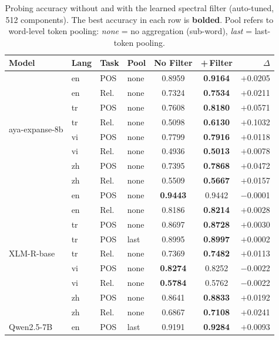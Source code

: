\begin{table}[h]
\centering
\small
\caption{Probing accuracy without and with the learned spectral filter (auto-tuned, 512 components).
         The best accuracy in each row is \textbf{bolded}.
         Pool refers to word-level token pooling: \textit{none} = no aggregation (sub-word),
         \textit{last} = last-token pooling.}
\label{tab:filter_comparison}
\begin{tabular}{llllccr}
\toprule
Model & Lang & Task & Pool & No Filter & +\,Filter & $\Delta$ \\
\midrule
\multirow{8}{*}{aya-expanse-8b}
  & en & POS  & none & 0.8959 & \textbf{0.9164} & $+$0.0205 \\
  & en & Rel.  & none & 0.7324 & \textbf{0.7534} & $+$0.0211 \\
  & tr & POS  & none & 0.7608 & \textbf{0.8180} & $+$0.0571 \\
  & tr & Rel.  & none & 0.5098 & \textbf{0.6130} & $+$0.1032 \\
  & vi & POS  & none & 0.7799 & \textbf{0.7916} & $+$0.0118 \\
  & vi & Rel.  & none & 0.4936 & \textbf{0.5013} & $+$0.0078 \\
  & zh & POS  & none & 0.7395 & \textbf{0.7868} & $+$0.0472 \\
  & zh & Rel.  & none & 0.5509 & \textbf{0.5667} & $+$0.0157 \\
\midrule
\multirow{9}{*}{XLM-R-base}
  & en & POS  & none & \textbf{0.9443} & 0.9442          & $-$0.0001 \\
  & en & Rel.  & none & 0.8186          & \textbf{0.8214} & $+$0.0028 \\
  & tr & POS  & none & 0.8697          & \textbf{0.8728} & $+$0.0030 \\
  & tr & POS  & last & 0.8995          & \textbf{0.8997} & $+$0.0002 \\
  & tr & Rel.  & none & 0.7369          & \textbf{0.7482} & $+$0.0113 \\
  & vi & POS  & none & \textbf{0.8274} & 0.8252          & $-$0.0022 \\
  & vi & Rel.  & none & \textbf{0.5784} & 0.5762          & $-$0.0022 \\
  & zh & POS  & none & 0.8641          & \textbf{0.8833} & $+$0.0192 \\
  & zh & Rel.  & none & 0.6867          & \textbf{0.7108} & $+$0.0241 \\
\midrule
\multirow{12}{*}{Qwen2.5-7B}
  & en & POS  & last & 0.9191 & \textbf{0.9284} & $+$0.0093 \\

\end{tabular}
\end{table}
